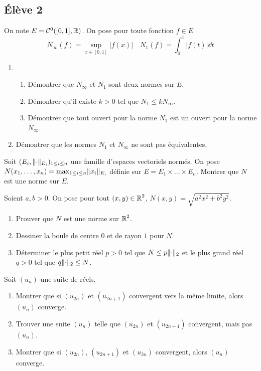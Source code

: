 \documentclass[10pt]{scrartcl}
\begin{document}
    \subsection*{Élève 2}
    \begin{ccp}
        On note $E=\mathcal C^0([0,1],\operatorname{\mathbb R})$. 
        On pose pour toute fonction $f\in E$ 
        \[
            N_\infty(f)=\sup_{x\in[0,1]}|f(x)|\quad N_1(f)=\int_0^1|f(t)|\dd t
        \]
        \begin{enumerate}
            \item
            \begin{enumerate}
                \item Démontrer que $N_\infty$ et $N_1$ sont deux normes sur $E$. 
                \item Démontrer qu'il existe $k>0$ tel que $N_1\leq kN_\infty$.
                \item Démontrer que tout ouvert pour la norme $N_1$ est un ouvert pour la norme $N_\infty$.
            \end{enumerate}
            \item Démontrer que les normes $N_1$ et $N_\infty$ ne sont pas équivalentes.
        \end{enumerate}
    \end{ccp}

    \begin{exo}
        Soit $(E_i,\lVert \cdot\rVert_{E_i})_{1\leq i\leq n}$ une famille d'espaces vectoriels normés. 
        On pose $N(x_1,\dots,x_n)=\max_{1\leq i\leq n}\lVert x_i\rVert_{E_i}$ définie sur $E=E_1\times\dots\times E_n$. 
        Montrer que $N$ est une norme sur $E$.
    \end{exo}

    \begin{exo}
        Soient $a,b>0$. On pose pour tout $(x,y)\in\operatorname{\mathbb R}^2$, $N(x,y)=\sqrt{a^2x^2+b^2y^2}$. 
        \begin{enumerate}
            \item Prouver que $N$ est une norme sur $\operatorname{\mathbb R}^2$.
            \item Dessiner la boule de centre $0$ et de rayon $1$ pour $N$.
            \item Déterminer le plus petit réel $p>0$ tel que $N\leq p\lVert \cdot\rVert_2$ et le plus grand réel $q>0$ tel que $q\lVert \cdot\rVert_2\leq N$.
        \end{enumerate}
    \end{exo}

    \begin{exo}
        Soit $(u_n)$ une suite de réels.
        \begin{enumerate}
            \item Montrer que si $(u_{2n})$ et $(u_{2n+1})$ convergent vers la même limite, alors $(u_n)$ converge. 
            \item Trouver une suite $(u_n)$ telle que $(u_{2n})$ et $(u_{2n+1})$ convergent, mais pas $(u_n)$.
            \item Montrer que si $(u_{2n})$, $(u_{2n+1})$ et $(u_{3n})$ convergent, alors $(u_n)$ converge.
        \end{enumerate}
    \end{exo}
\end{document}
